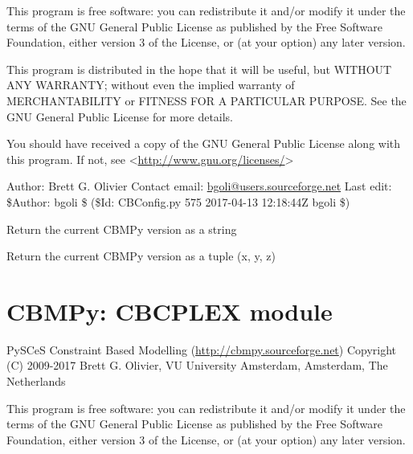 \documentclass[a4paper,11pt,english]{sphinxmanual}
\begin{document}
This program is free software: you can redistribute it and/or modify
it under the terms of the GNU General Public License as published by
the Free Software Foundation, either version 3 of the License, or
(at your option) any later version.

This program is distributed in the hope that it will be useful,
but WITHOUT ANY WARRANTY; without even the implied warranty of
MERCHANTABILITY or FITNESS FOR A PARTICULAR PURPOSE.  See the
GNU General Public License for more details.

You should have received a copy of the GNU General Public License
along with this program.  If not, see \textless{}\url{http://www.gnu.org/licenses/}\textgreater{}

Author: Brett G. Olivier
Contact email: \href{mailto:bgoli@users.sourceforge.net}{bgoli@users.sourceforge.net}
Last edit: \$Author: bgoli \$ (\$Id: CBConfig.py 575 2017-04-13 12:18:44Z bgoli \$)

\begin{fulllineitems}
\label{modules_doc:cbmpy.CBConfig.current_version}
Return the current CBMPy version as a string

\end{fulllineitems}


\begin{fulllineitems}
\label{modules_doc:cbmpy.CBConfig.current_version_tuple}
Return the current CBMPy version as a tuple (x, y, z)

\end{fulllineitems}

\label{modules_doc:module-cbmpy.CBCPLEX}

\section{CBMPy: CBCPLEX module}
\label{modules_doc:cbmpy-cbcplex-module}
PySCeS Constraint Based Modelling (\url{http://cbmpy.sourceforge.net})
Copyright (C) 2009-2017 Brett G. Olivier, VU University Amsterdam, Amsterdam, The Netherlands

This program is free software: you can redistribute it and/or modify
it under the terms of the GNU General Public License as published by
the Free Software Foundation, either version 3 of the License, or
(at your option) any later version.
\end{document}
